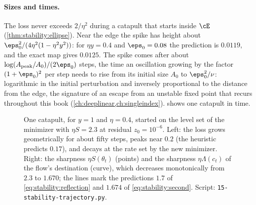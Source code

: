 \begin{refsection}
\paragraph{Sizes and times.} The loss never exceeds $2/\eta^2$ during a catapult that starts inside $\cE$ (\cref{thm:stability:ellipse}). Near the edge the spike has height about $\eps_0^2/(4\eta^2(1-\eta^2y^2))$: for $\eta y=0.4$ and $\eps_0=0.08$ the prediction is $0.0119$, and the exact map gives $0.0125$. The spike comes after about $\log(A_{\mathrm{peak}}/A_0)/(2\eps_0)$ steps, the time an oscillation growing by the factor $(1+\eps_0)^2$ per step needs to rise from its initial size $A_0$ to $\eps_0^2/\nu$: logarithmic in the initial perturbation and inversely proportional to the distance from the edge, the signature of an escape from an unstable fixed point that recurs throughout this book (\cref{ch:deeplinear,ch:singleindex}).  shows one catapult in time.

\begin{figure}[t]
\begin{fullwidth}
\centering
{}
\end{fullwidth}
\caption{One catapult, for $y=1$ and $\eta=0.4$, started on the level set of the minimizer with $\eta S=2.3$ at residual $z_0=10^{-6}$. Left: the loss grows geometrically for about fifty steps, peaks near $0.2$ (the heuristic predicts $0.17$), and decays at the rate set by the new minimizer. Right: the sharpness $\eta S(\theta_t)$ (points) and the sharpness $\eta\Lambda(c_t)$ of the flow's destination (curve), which decreases monotonically from $2.3$ to $1.670$; the lines mark the predictions $1.7$ of \eqref{eq:stability:reflection} and $1.674$ of \eqref{eq:stability:second}. Script: \texttt{15-stability-trajectory.py}.}
\label{fig:stability:trajectory}
\end{figure}


\end{refsection}
